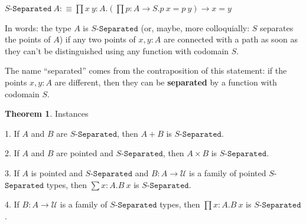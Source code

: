 \documentclass[11pt]{article}
\theoremstyle{definition}
\newtheorem{theorem}{Theorem}[section]
\newcommand{\txt}[1]{\texttt{#1}}
\renewcommand{\(}{\left(}
\renewcommand{\)}{\right)}
\newcommand{\defn}{:\equiv}
\newcommand{\U}{\mathcal{U}}
\newcommand{\apl}[2]{#1\ #2}
\newcommand{\dprod}[2]{\prod #1.#2}
\newcommand{\dsum}[2]{\sum #1.#2}
\newcommand{\prodt}[2]{#1 \times #2}
\begin{document}
\newcommand{\Separated}[1]{#1$-$\txt{Separated}}
$\displaystyle \apl{\Separated{S}}{A} \defn \dprod{x\ y : A}{\(\dprod{p : A \to S}{\apl{p}{x} = \apl{p}{y}}\) \to x = y}$

In words: the type $A$ is $\Separated{S}$ (or, maybe, more colloquially: $S$ separates the points of $A$) if any two points of $x, y : A$ are connected with a path as soon as they can't be distinguished using any function with codomain $S$.

The name ``separated'' comes from the contraposition of this statement: if the points $x, y : A$ are different, then they can be \textbf{separated} by a function with codomain $S$.

\begin{theorem} Instances

1. If $A$ and $B$ are $\Separated{S}$, then $A + B$ is $\Separated{S}$.

2. If $A$ and $B$ are pointed and $\Separated{S}$, then $\prodt{A}{B}$ is $\Separated{S}$.

3. If $A$ is pointed and $\Separated{S}$ and $B : A \to \U$ is a family of pointed $\Separated{S}$ types, then $\dsum{x : A}{\apl{B}{x}}$ is $\Separated{S}$.

4. If $B : A \to \U$ is a family of $\Separated{S}$ types, then $\dprod{x : A}{\apl{B}{x}}$ is $\Separated{S}$.

\end{theorem}
\end{document}

